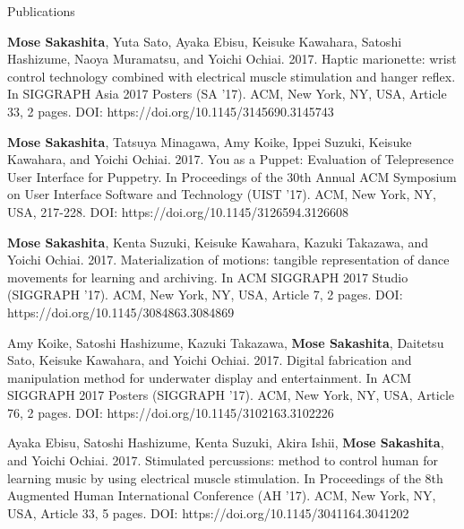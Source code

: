 \documentclass{resume} %
\begin{document}
\begin{rSection}{Publications} \itemsep 4pt
\item \textbf{Mose Sakashita}, Yuta Sato, Ayaka Ebisu, Keisuke Kawahara, Satoshi Hashizume, Naoya Muramatsu, and Yoichi Ochiai. 2017. Haptic marionette: wrist control technology combined with electrical muscle stimulation and hanger reflex. In SIGGRAPH Asia 2017 Posters (SA '17). ACM, New York, NY, USA, Article 33, 2 pages. DOI: https://doi.org/10.1145/3145690.3145743

\item \textbf{Mose Sakashita}, Tatsuya Minagawa, Amy Koike, Ippei Suzuki, Keisuke Kawahara, and Yoichi Ochiai. 2017. You as a Puppet: Evaluation of Telepresence User Interface for Puppetry. In Proceedings of the 30th Annual ACM Symposium on User Interface Software and Technology (UIST ’17). ACM, New York, NY, USA, 217-228. DOI: https://doi.org/10.1145/3126594.3126608

\item \textbf{Mose Sakashita}, Kenta Suzuki, Keisuke Kawahara, Kazuki Takazawa, and Yoichi Ochiai. 2017. Materialization of motions: tangible representation of dance movements for learning and archiving. In ACM SIGGRAPH 2017 Studio (SIGGRAPH '17). ACM, New York, NY, USA, Article 7, 2 pages. DOI: https://doi.org/10.1145/3084863.3084869

\item Amy Koike, Satoshi Hashizume, Kazuki Takazawa, \textbf{Mose Sakashita}, Daitetsu Sato, Keisuke Kawahara, and Yoichi Ochiai. 2017. Digital fabrication and manipulation method for underwater display and entertainment. In ACM SIGGRAPH 2017 Posters (SIGGRAPH '17). ACM, New York, NY, USA, Article 76, 2 pages. DOI: https://doi.org/10.1145/3102163.3102226

\item Ayaka Ebisu, Satoshi Hashizume, Kenta Suzuki, Akira Ishii, \textbf{Mose Sakashita}, and Yoichi Ochiai. 2017. Stimulated percussions: method to control human for learning music by using electrical muscle stimulation. In Proceedings of the 8th Augmented Human International Conference (AH '17). ACM, New York, NY, USA, Article 33, 5 pages. DOI: https://doi.org/10.1145/3041164.3041202


\end{rSection}
\end{document}
